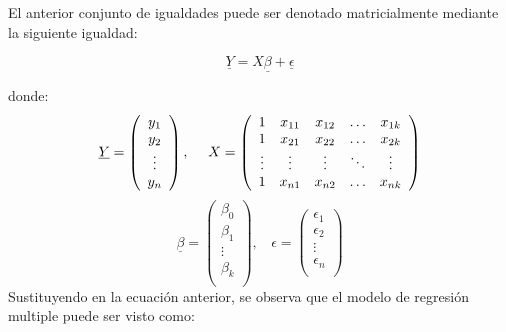 \documentclass[
  a4paper,
  oneside,
  openany]{book}
\begin{document}
El anterior conjunto de igualdades puede ser denotado matricialmente mediante la siguiente igualdad:

\[\underline{Y}=X\underline{\beta}+\underline{\epsilon}\]

donde:
\[
\underline{Y}=
\left(
\begin{array}{c}
y_{1} \\
y_{2} \\
\vdots \\
y_{n}\\
\end{array}
\right),\ \ \ \  X=
\left(
\begin{array}{c c c c c}
1      & x_{11} & x_{12} & \ldots & x_{1k}\\ 
1      & x_{21} & x_{22} & \ldots & x_{2k}\\
\vdots & \vdots & \vdots & \ddots & \vdots\\
1      & x_{n1} & x_{n2} & \ldots & x_{nk}\\
\end{array}
\right)
\]
\[
\underline{\beta}=
\left(
\begin{array}{c}
\beta_{0} \\
\beta_{1} \\
\vdots \\
\beta_{k}\\
\end{array}
\right),\ \ \ \  \epsilon=
\left(
\begin{array}{c}
\epsilon_{1} \\
\epsilon_{2} \\
\vdots \\
\epsilon_{n}\\
\end{array}
\right)
\]
Sustituyendo en la ecuación anterior, se observa que el modelo de regresión multiple puede ser visto como:
\end{document}
